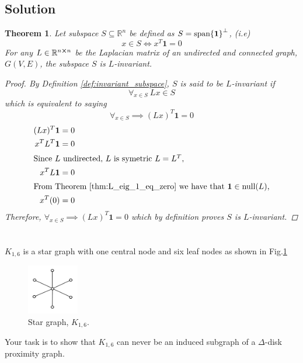 \documentclass[]{article}
\numberwithin{equation}{section}
\renewcommand{\figurename}{Fig.}
\newcommand{\R}{\mathbb{R}}
\newtheorem{theorem}{Theorem}
\begin{document}
\subsection{Solution}
\begin{theorem}\label{thm:pblm4}
	Let subspace $S \subseteq \R^{n}$ be defined as $S = \textnormal{span}\qty{\mathbf{1}}^{\perp}$, (i.e)\[
		x\in S \iff x^T \mathbf{1} = 0
	\] For any $L \in \R^{n\cross n}$ be the Laplacian matrix of an undirected and connected graph, $G(V,E)$, the subspace $S$ is $L$-invariant.
	\begin{proof}
		By Definition \ref{def:invariant_subspace}, $S$ is said to be $L$-invariant if \[
			\forall_{x\in S} \
			 L x \in S
		\] which is equivalent to saying \[
			\forall_{x\in S} \implies (L x)^T \mathbf{1} = 0
		\]
		\begin{align*}
			(Lx)^T \mathbf{1} = 0\\
			x^T L^T \mathbf{1} = 0\\
			\intertext{Since $L$ undirected, $L$ is symetric $L=L^T$,}
			x^T L \mathbf{1} = 0\\
			\intertext{From Theorem \ref{thm:L_eig_1_eq_zero} we have that $\mathbf{1} \in \text{null}\qty(L)$,}
			x^T (0) = 0
		\end{align*}
		Therefore, $\forall_{x\in S} \implies (L x)^T \mathbf{1} = 0$ which by definition proves $S$ is $L$-invariant.
	\end{proof}
\end{theorem}


\newpage
\section{}
$K_{1,6}$ is a star graph with one central node and six leaf nodes as shown in \figurename\ref{fig:pblm5}

\begin{figure}[h]
	\centering
	\includegraphics[width=0.2\textwidth]{figs/pblm5.png}
	\caption{Star graph, $K_{1,6}$.}
	\label{fig:pblm5}
\end{figure}

Your task is to show that $K_{1,6}$ can never be an induced subgraph of a $\Delta$-disk proximity graph.
\end{document}

